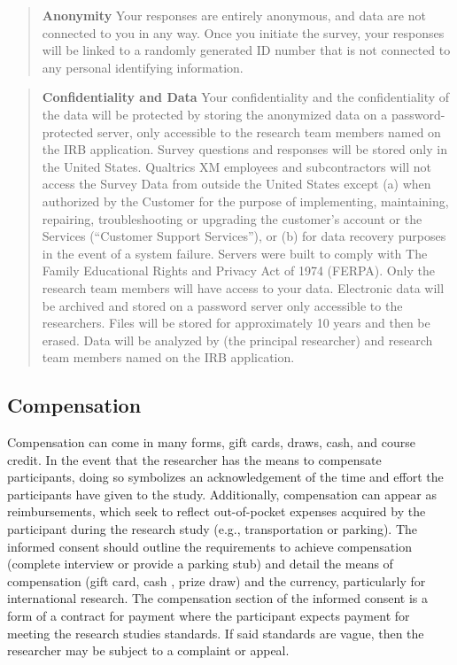 \documentclass[
  11pt,
]{book}
\begin{document}
\begin{quote}
\textbf{Anonymity} Your responses are entirely anonymous, and data are not connected to you in any way. Once you initiate the survey, your responses will be linked to a randomly generated ID number that is not connected to any personal identifying information.
\end{quote}

\begin{quote}
\textbf{Confidentiality and Data} Your confidentiality and the confidentiality of the data will be protected by storing the anonymized data on a password-protected server, only accessible to the research team members named on the IRB application. Survey questions and responses will be stored only in the United States. Qualtrics XM employees and subcontractors will not access the Survey Data from outside the United States except (a) when authorized by the Customer for the purpose of implementing, maintaining, repairing, troubleshooting or upgrading the customer's account or the Services (``Customer Support Services''), or (b) for data recovery purposes in the event of a system failure. Servers were built to comply with The Family Educational Rights and Privacy Act of 1974 (FERPA). Only the research team members will have access to your data. Electronic data will be archived and stored on a password server only accessible to the researchers. Files will be stored for approximately 10 years and then be erased. Data will be analyzed by (the principal researcher) and research team members named on the IRB application.
\end{quote}

\subsection{Compensation}\label{compensation}

Compensation can come in many forms, gift cards, draws, cash, and course credit. In the event that the researcher has the means to compensate participants, doing so symbolizes an acknowledgement of the time and effort the participants have given to the study. Additionally, compensation can appear as reimbursements, which seek to reflect out-of-pocket expenses acquired by the participant during the research study (e.g., transportation or parking). The informed consent should outline the requirements to achieve compensation (complete interview or provide a parking stub) and detail the means of compensation (gift card, cash , prize draw) and the currency, particularly for international research. The compensation section of the informed consent is a form of a contract for payment where the participant expects payment for meeting the research studies standards. If said standards are vague, then the researcher may be subject to a complaint or appeal.
\end{document}
